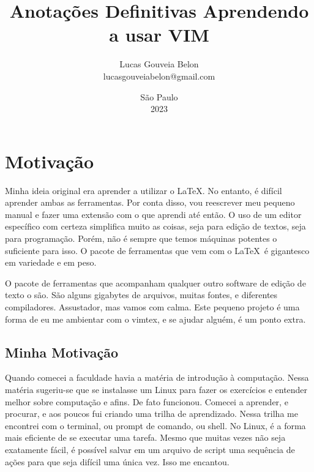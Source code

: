 \documentclass[a4paper, 12pt]{article}
\begin{document}
\title{                                 %
    \textbf{                            %
    Anotações Definitivas               %
    }                                   %
    \break                              %
    Aprendendo a usar VIM               %
}                                       %
\author{                                %
    Lucas Gouveia Belon                 %
    \\                                  %
    lucasgouveiabelon@gmail.com         %
}                                       %
\date{\vspace{2.2cm}São Paulo\\2023}    %
\maketitle                              %
\newpage                                %

\tableofcontents                        %
\newpage                                %


\section{Motivação}
Minha ideia original era aprender a utilizar o \LaTeX.
No entanto, é difícil aprender ambas as ferramentas.
Por conta disso, vou reescrever meu pequeno manual e fazer uma extensão com o que aprendi até então.
O uso de um editor específico com certeza simplifica muito as coisas, seja para edição de textos, seja para programação.
Porém, não é sempre que temos máquinas potentes o suficiente para isso.
O pacote de ferramentas que vem com o \LaTeX\ é gigantesco em variedade e em peso.

O pacote de ferramentas que acompanham qualquer outro software de edição de texto o são.
São alguns gigabytes de arquivos, muitas fontes, e diferentes compiladores.
Assustador, mas vamos com calma.
Este pequeno projeto é uma forma de eu me ambientar com o vimtex, e se ajudar alguém, é um ponto extra.

\subsection{Minha Motivação}
Quando comecei a faculdade havia a matéria de introdução à computação.
Nessa matéria sugeriu-se que se instalasse um Linux para fazer os exercícios e entender melhor sobre computação e afins.
De fato funcionou.
Comecei a aprender, e procurar, e aos poucos fui criando uma trilha de aprendizado.
Nessa trilha me encontrei com o terminal, ou prompt de comando, ou shell.
No Linux, é a forma mais eficiente de se executar uma tarefa.
Mesmo que muitas vezes não seja exatamente fácil, é possível salvar em um arquivo de script uma sequência de ações para que seja difícil uma única vez.
Isso me encantou.
\end{document}
